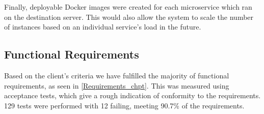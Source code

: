     Finally, deployable Docker images were created for each microservice which ran on the destination server. This would also allow the system to scale the number of instances based on an individual service's load in the future.

\subsection{Functional Requirements}
    \par
    Based on the client's criteria we have fulfilled the majority of functional requirements, as seen in \ref{Requirements_chpt}. This was measured using acceptance tests, which give a rough indication of conformity to the requirements. 129 tests were performed with 12 failing, meeting 90.7\% of the requirements.